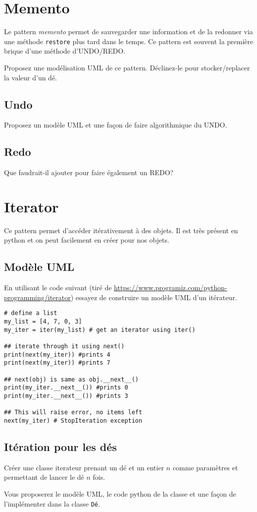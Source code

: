 \documentclass[12pt]{article}
\begin{document}
\section{Memento}

Le pattern {\em memento} permet de sauvegarder une information et de la redonner via une méthode \verb|restore| plus tard dans le temps. Ce pattern est souvent la première brique d'une méthode d'UNDO/REDO.


Proposez une modélisation UML de ce pattern. Déclinez-le pour stocker/replacer la valeur d'un dé.

\subsection{Undo}
Proposez un modèle UML et une façon de faire algorithmique du UNDO. 

\subsection{Redo}

Que faudrait-il ajouter pour faire également un REDO?


\section{Iterator}

Ce pattern permet d'accéder itérativement à des objets. Il est très présent en python et on peut facilement en créer pour nos objets.

\subsection{Modèle UML}

En utilisant le code suivant (tiré de \url{https://www.programiz.com/python-programming/iterator}) essayez de construire un modèle UML d'un itérateur.

\lstset{language=Python}
\begin{lstlisting}
# define a list
my_list = [4, 7, 0, 3]
my_iter = iter(my_list) # get an iterator using iter()

## iterate through it using next() 
print(next(my_iter)) #prints 4
print(next(my_iter)) #prints 7

## next(obj) is same as obj.__next__()
print(my_iter.__next__()) #prints 0
print(my_iter.__next__()) #prints 3

## This will raise error, no items left
next(my_iter) # StopIteration exception
\end{lstlisting}

\subsection{Itération pour les dés}

Créer une classe iterateur prenant un dé et un entier $n$ comme paramètres et permettant de lancer le dé $n$ fois.

Vous proposerez le modèle UML, le code python de la classe et une façon de l'implémenter dans la classe \verb|Dé|.
\end{document}
